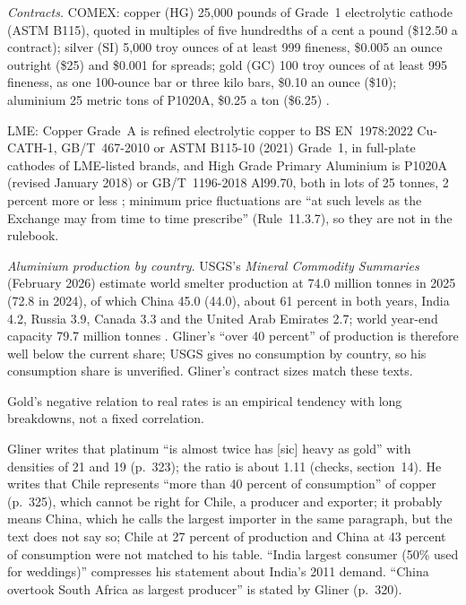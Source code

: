 \begin{qfdefinition}
\emph{Contracts.} COMEX: copper (HG) 25{,}000 pounds of Grade~1 electrolytic cathode (ASTM B115), quoted in multiples of five hundredths of a cent a pound (\$12.50 a contract); silver (SI) 5{,}000 troy ounces of at least 999 fineness, \$0.005 an ounce outright (\$25) and \$0.001 for spreads; gold (GC) 100 troy ounces of at least 995 fineness, as one 100-ounce bar or three kilo bars, \$0.10 an ounce (\$10); aluminium 25 metric tons of P1020A, \$0.25 a ton (\$6.25) \citep[Rules 107102, 111101--111102, 112101--112102 and 113101--113102]{comex-metals-chapters-2026}.

LME: Copper Grade~A is refined electrolytic copper to BS EN~1978:2022 Cu-CATH-1, GB/T~467-2010 or ASTM B115-10 (2021) Grade~1, in full-plate cathodes of LME-listed brands, and High Grade Primary Aluminium is P1020A (revised January 2018) or GB/T~1196-2018 Al99.70, both in lots of 25 tonnes, 2 percent more or less \citep[Part~6, pp.~6-1 and~6-11]{lme-rulebook-2026-10}; minimum price fluctuations are ``at such levels as the Exchange may from time to time prescribe'' (Rule~11.3.7), so they are not in the rulebook.

\emph{Aluminium production by country}. USGS's \emph{Mineral Commodity Summaries} (February 2026) estimate world smelter production at 74.0 million tonnes in 2025 (72.8 in 2024), of which China 45.0 (44.0), about 61 percent in both years, India 4.2, Russia 3.9, Canada 3.3 and the United Arab Emirates 2.7; world year-end capacity 79.7 million tonnes \citep[Aluminum, p.~2]{usgs-mcs-2026-aluminum}. Gliner's ``over 40 percent'' of production is therefore well below the current share; USGS gives no consumption by country, so his consumption share is unverified. Gliner's contract sizes match these texts.

 Gold's negative relation to real rates is an empirical tendency with long breakdowns, not a fixed correlation.

 Gliner writes that platinum ``is almost twice has [sic] heavy as gold'' with densities of 21 and 19 (p.~323); the ratio is about 1.11 (checks, section~14). He writes that Chile represents ``more than 40 percent of consumption'' of copper (p.~325), which cannot be right for Chile, a producer and exporter; it probably means China, which he calls the largest importer in the same paragraph, but the text does not say so; Chile at 27 percent of production and China at 43 percent of consumption were not matched to his table. ``India largest consumer (50\% used for weddings)'' compresses his statement about India's 2011 demand. ``China overtook South Africa as largest producer'' is stated by Gliner (p.~320).


\end{qfdefinition}
